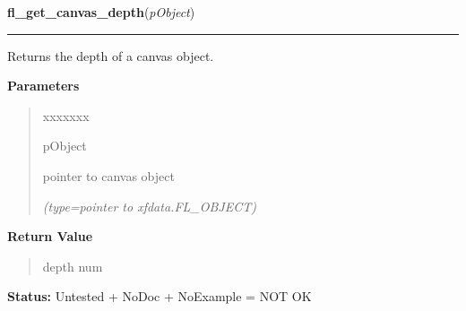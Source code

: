\hspace{.8\funcindent}\begin{boxedminipage}{\funcwidth}

    \raggedright \textbf{fl\_get\_canvas\_depth}(\textit{pObject})

    \vspace{-1.5ex}

    \rule{\textwidth}{0.5\fboxrule}
\setlength{\parskip}{2ex}
    Returns the depth of a canvas object.

\setlength{\parskip}{1ex}
      \textbf{Parameters}
      \vspace{-1ex}

      \begin{quote}
        \begin{Ventry}{xxxxxxx}

          \item[pObject]

          pointer to canvas object

            {\it (type=pointer to xfdata.FL\_OBJECT)}

        \end{Ventry}

      \end{quote}

      \textbf{Return Value}
    \vspace{-1ex}

      \begin{quote}
      depth num

      \end{quote}

\textbf{Status:} Untested + NoDoc + NoExample = NOT OK



    \end{boxedminipage}

    \label{xformslib:library:fl_remove_canvas_handler}

    \vspace{0.5ex}

